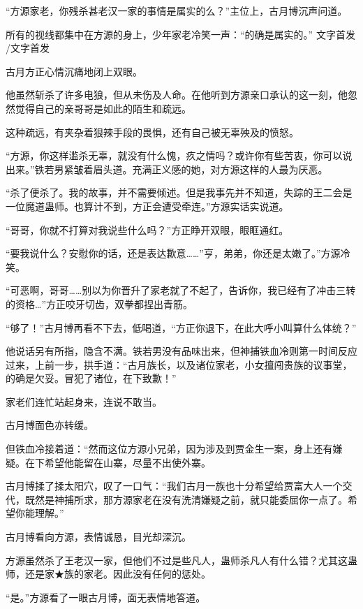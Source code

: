 
\begin{this_body}

“方源家老，你残杀甚老汉一家的事情是属实的么？”主位上，古月博沉声问道。

所有的视线都集中在方源的身上，少年家老冷笑一声：“的确是属实的。” 文字首发 /文字首发

古月方正心情沉痛地闭上双眼。

他虽然斩杀了许多电狼，但从未伤及人命。在他听到方源亲口承认的这一刻，他忽然觉得自己的亲哥哥是如此的陌生和疏远。

这种疏远，有夹杂着狠辣手段的畏惧，还有自己被无辜殃及的愤怒。

“方源，你这样滥杀无辜，就没有什么愧，疚之情吗？或许你有些苦衷，你可以说出来。”铁若男紧皱着眉头道。充满正义感的她，对方源这样的人最为厌恶。

“杀了便杀了。我的故事，并不需要倾述。但是我事先并不知道，失踪的王二会是一位魔道蛊师。也算计不到，方正会遭受牵连。”方源实话实说道。

“哥哥，你就不打算对我说些什么吗？”方正睁开双眼，眼眶通红。

“要我说什么？安慰你的话，还是表达歉意……”亨，弟弟，你还是太嫩了。”方源冷笑。

“可恶啊，哥哥……别以为你晋升了家老就了不起了，告诉你，我已经有了冲击三转的资格…”方正咬牙切齿，双拳都捏出青筋。

“够了！”古月博再看不下去，低喝道，“方正你退下，在此大呼小叫算什么体统？”

他说话另有所指，隐含不满。铁若男没有品味出来，但神捕铁血冷则第一时间反应过来，上前一步，拱手道：“古月族长，以及诸位家老，小女擅闯贵族的议事堂，的确是欠妥。冒犯了诸位，在下致歉！”

家老们连忙站起身来，连说不敢当。

古月博面色亦转缓。

但铁血冷接着道：“然而这位方源小兄弟，因为涉及到贾金生一案，身上还有嫌疑。在下希望他能留在山寨，尽量不出使外寨。

古月博揉了揉太阳穴，叹了一口气：“我们古月一族也十分希望给贾富大人一个交代，既然是神捕所求，那方源家老在没有洗清嫌疑之前，就只能委屈你一点了。希望你能理解。”

古月博看向方源，表情诚恳，目光却深沉。

方源虽然杀了王老汉一家，但他们不过是些凡人，蛊师杀凡人有什么错？尤其这蛊师，还是家★族的家老。因此没有任何的惩处。

“是。”方源看了一眼古月博，面无表情地答道。


\end{this_body}
